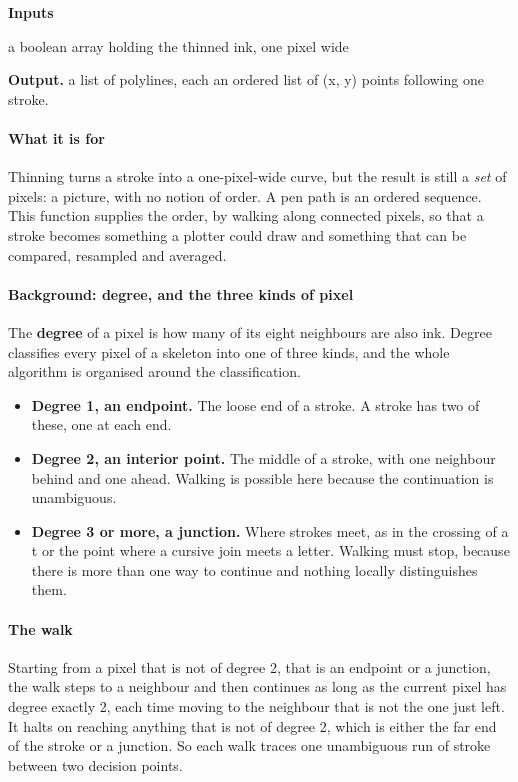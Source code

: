 \noindent\textbf{Inputs}
\begin{description}[leftmargin=2.2em,style=nextline,font=\normalfont\ttfamily]\setlength\itemsep{1pt}
  \item[{skel}] \normalfont a boolean array holding the thinned ink, one pixel wide
\end{description}

\noindent\textbf{Output.} a list of polylines, each an ordered list of (x, y) points following one stroke.


\paragraph{What it is for}
Thinning turns a stroke into a one-pixel-wide curve, but the result is still a \emph{set} of pixels: a picture, with no notion of order. A pen path is an ordered sequence. This function supplies the order, by walking along connected pixels, so that a stroke becomes something a plotter could draw and something that can be compared, resampled and averaged.


\paragraph{Background: degree, and the three kinds of pixel}
The \textbf{degree} of a pixel is how many of its eight neighbours are also ink. Degree classifies every pixel of a skeleton into one of three kinds, and the whole algorithm is organised around the classification.


\begin{itemize}\setlength\itemsep{0pt}
  \item \textbf{Degree 1, an endpoint.} The loose end of a stroke. A stroke has two of these, one at each end.
  \item \textbf{Degree 2, an interior point.} The middle of a stroke, with one neighbour behind and one ahead. Walking is possible here because the continuation is unambiguous.
  \item \textbf{Degree 3 or more, a junction.} Where strokes meet, as in the crossing of a t or the point where a cursive join meets a letter. Walking must stop, because there is more than one way to continue and nothing locally distinguishes them.
\end{itemize}

\paragraph{The walk}
Starting from a pixel that is not of degree 2, that is an endpoint or a junction, the walk steps to a neighbour and then continues as long as the current pixel has degree exactly 2, each time moving to the neighbour that is not the one just left. It halts on reaching anything that is not of degree 2, which is either the far end of the stroke or a junction. So each walk traces one unambiguous run of stroke between two decision points.

